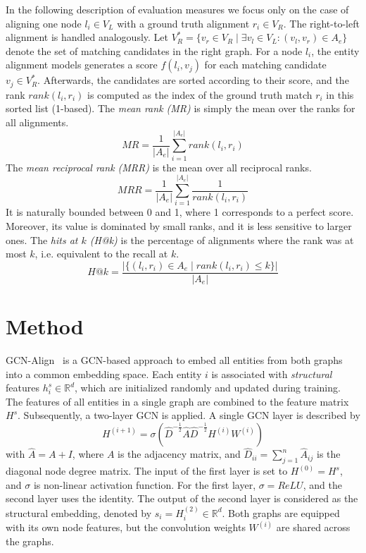 \documentclass[runningheads]{llncs}
\begin{document}
In the following description of evaluation measures we focus only on the case of aligning one node $l_i \in V_L$ with a ground truth alignment $r_i \in V_R$.
The right-to-left alignment is handled analogously.
Let $V_R^* = \{v_r \in V_R \mid \exists v_l \in V_L: (v_l, v_r) \in A_e\}$ denote the set of matching candidates in the right graph.
For a node $l_i$, the entity alignment models generates a score $f(l_i, v_j)$ for each matching candidate $v_j \in V_R^*$.
Afterwards, the candidates are sorted according to their score, and the rank $rank(l_i, r_i)$ is computed as the index of the ground truth match $r_i$ in this sorted list (1-based).
The \emph{mean rank (MR)} is simply the mean over the ranks for all alignments.
$$
MR = \frac{1}{|A_e|}\sum \limits_{i=1}^{|A_e|} rank(l_i, r_i)
$$
The \emph{mean reciprocal rank (MRR)} is the mean over all reciprocal ranks.
$$
MRR = \frac{1}{|A_e|}\sum \limits_{i=1}^{|A_e|} \frac{1}{rank(l_i, r_i)}
$$
It is naturally bounded between 0 and 1, where 1 corresponds to a perfect score.
Moreover, its value is dominated by small ranks, and it is less sensitive to larger ones.
The \emph{hits at $k$ (H@k)} is the percentage of alignments where the rank was at most $k$, i.e. equivalent to the recall at $k$.
$$
H@k = \frac{|\{(l_i, r_i) \in A_e \mid rank(l_i, r_i) \leq k\}|}{|A_e|}
$$ \section{Method}
GCN-Align~\cite{DBLP:conf/emnlp/WangLLZ18} is a GCN-based approach to embed all entities from both graphs into a common embedding space.
Each entity $i$ is associated with \emph{structural} features $h_i^s \in \mathbb{R}^d$, which are initialized randomly and updated during training.
The features of all entities in a single graph are combined to the feature matrix $H^s$.
Subsequently, a two-layer GCN is applied.
A single GCN layer is described by
$$
H^{(i+1)} = \sigma\left(\hat{D}^{-\frac{1}{2}}\hat{A}\hat{D}^{-\frac{1}{2}}H^{(i)}W^{(i)}\right)
$$
with $\hat{A} = A + I$, where $A$ is the adjacency matrix, and $\hat{D}_{ii} = \sum \limits_{j=1}^n \hat{A}_{ij}$ is the diagonal node degree matrix.
The input of the first layer is set to $H^{(0)} = H^s$, and $\sigma$ is non-linear activation function.
For the first layer, $\sigma=ReLU$, and the second layer uses the identity.
The output of the second layer is considered as the structural embedding, denoted by $s_i = H^{(2)}_i \in \mathbb{R}^{d}$.
Both graphs are equipped with its own node features, but the convolution weights $W^{(i)}$ are shared across the graphs.
\end{document}
